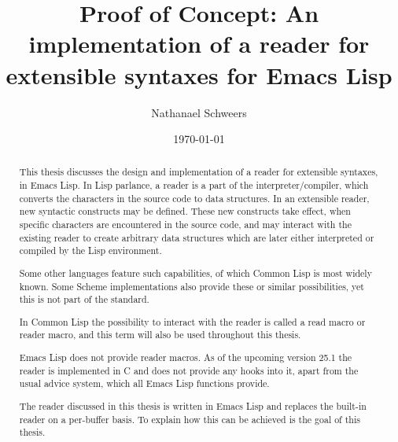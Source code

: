 \documentclass[11pt]{article}
\author{Nathanael Schweers}
\date{\today}
\title{Proof of Concept: An implementation of a reader for extensible syntaxes for Emacs Lisp}
\newcommand{\el}{Emacs Lisp}
\newcommand{\cl}{Common Lisp}
\begin{document}
\lstset{language=Lisp}

\maketitle
\tableofcontents

\begin{comment}
  \begin{abstract}
    In this thesis an extensible reader for \el{} is discussed.  This reader has
    also been implemented to the point of basic usability, yet is not yet
    complete.  Also, integration with Emacs’ navigation commands is not optimal.
    This is due to the fact, that Emacs tries to find balanced parenthesis on
    several occasions, as it assumes these are the only chars which can enclose
    an sexp.
  \end{abstract}
\end{comment}


\begin{abstract}
  This thesis discusses the design and implementation of a reader for extensible
  syntaxes, in Emacs Lisp.  In Lisp parlance, a reader is a part of the
  interpreter/compiler, which converts the characters in the source code to data
  structures.  In an extensible reader, new syntactic constructs may be
  defined.  These new constructs take effect, when specific characters are
  encountered in the source code, and may interact with the existing reader to
  create arbitrary data structures which are later either interpreted or
  compiled by the Lisp environment.

  Some other languages feature such capabilities, of which \cl{} is most widely
  known.  Some Scheme implementations also provide these or similar
  possibilities, yet this is not part of the standard. 

  In \cl{} the possibility to interact with the reader is called a read macro or
  reader macro, and this term will also be used throughout this thesis.

  \el{} does not provide reader macros.  As of the upcoming version 25.1 the
  reader is implemented in C and does not provide any hooks into it, apart from
  the usual advice system, which all \el{} functions provide.

  The reader discussed in this thesis is written in \el{} and replaces the
  built-in reader on a per-buffer basis.  To explain how this can be achieved is
  the goal of this thesis. 
\end{abstract}
\end{document}
